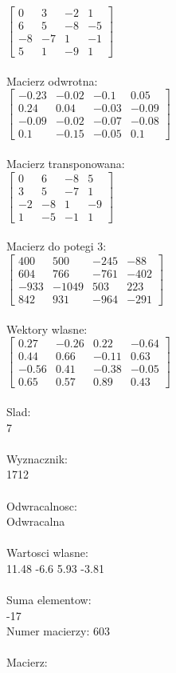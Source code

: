 \documentclass[a4paper,12pt]{article}
\begin{document}
$\begin{bmatrix} 0&3&-2&1\\6&5&-8&-5\\-8&-7&1&-1\\5&1&-9&1 \end{bmatrix}$
\\
\\
Macierz odwrotna:\\

$\begin{bmatrix} -0.23&-0.02&-0.1&0.05\\0.24&0.04&-0.03&-0.09\\-0.09&-0.02&-0.07&-0.08\\0.1&-0.15&-0.05&0.1 \end{bmatrix}$
\\
\\
Macierz transponowana:\\

$\begin{bmatrix} 0&6&-8&5\\3&5&-7&1\\-2&-8&1&-9\\1&-5&-1&1 \end{bmatrix}$
\\
\\
Macierz do potegi 3:\\

$\begin{bmatrix} 400&500&-245&-88\\604&766&-761&-402\\-933&-1049&503&223\\842&931&-964&-291 \end{bmatrix}$
\\
\\
Wektory wlasne:\\

$\begin{bmatrix} 0.27&-0.26&0.22&-0.64\\0.44&0.66&-0.11&0.63\\-0.56&0.41&-0.38&-0.05\\0.65&0.57&0.89&0.43 \end{bmatrix}$
\\
\\
Slad:\\
7
\\
\\
Wyznacznik:\\
1712
\\
\\
Odwracalnosc:\\
Odwracalna
\\
\\
Wartosci wlasne:\\
11.48 -6.6 5.93 -3.81
\\
\\
Suma elementow:\\
-17
\\
\newpage
Numer macierzy:
603
\\
\\
Macierz:\\
\end{document}
